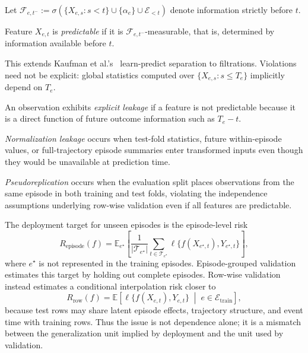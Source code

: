 \documentclass[runningheads]{llncs}
\newcommand{\1}{\mathbf{1}}
\newcommand{\E}{\mathbb{E}}
\begin{document}
Let $\mathcal{F}_{e,t^-} := \sigma(\{X_{e,s} : s < t\} \cup \{\alpha_e\} \cup \mathcal{E}_{<t})$ denote information strictly before $t$.

\begin{definition}
Feature $X_{e,t}$ is \emph{predictable} if it is $\mathcal{F}_{e,t^-}$-measurable, that is, determined by information available before $t$.
\end{definition}

This extends Kaufman et al.'s~\cite{kaufman2012} learn-predict separation to filtrations. Violations need not be explicit: global statistics computed over $\{X_{e,s} : s \leq T_e\}$ implicitly depend on $T_e$.

\begin{definition}
An observation exhibits \emph{explicit leakage} if a feature is not predictable because it is a direct function of future outcome information such as $T_e - t$.
\end{definition}

\begin{definition}
\emph{Normalization leakage} occurs when test-fold statistics, future within-episode values, or full-trajectory episode summaries enter transformed inputs even though they would be unavailable at prediction time.
\end{definition}

\begin{definition}[Pseudoreplication]
\emph{Pseudoreplication} occurs when the evaluation split places observations from the same episode in both training and test folds, violating the independence assumptions underlying row-wise validation even if all features are predictable.
\end{definition}

The deployment target for unseen episodes is the episode-level risk
\[
R_{\mathrm{episode}}(f)
=
\E_{e^\star}
\left[
\frac{1}{|\mathcal{T}_{e^\star}|}
\sum_{t\in\mathcal{T}_{e^\star}}
\ell\{f(X_{e^\star,t}),Y_{e^\star,t}\}
\right],
\]
where $e^\star$ is not represented in the training episodes. Episode-grouped validation estimates this target by holding out complete episodes. Row-wise validation instead estimates a conditional interpolation risk closer to
\[
R_{\mathrm{row}}(f)
=
\E
\left[
\ell\{f(X_{e,t}),Y_{e,t}\}
\;\middle|\;
e\in\mathcal{E}_{\mathrm{train}}
\right],
\]
because test rows may share latent episode effects, trajectory structure, and event time with training rows. Thus the issue is not dependence alone; it is a mismatch between the generalization unit implied by deployment and the unit used by validation.
\end{document}
